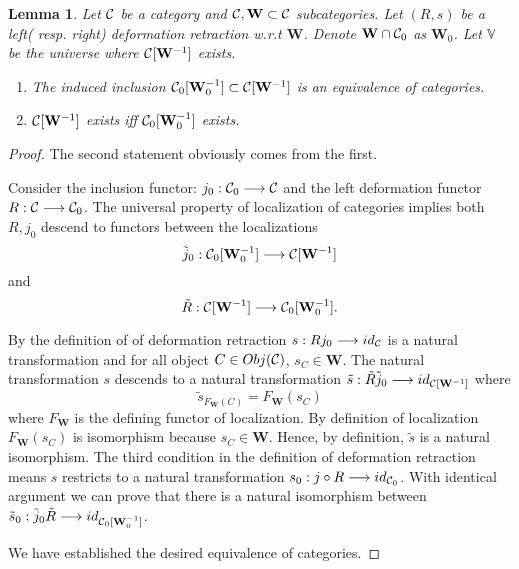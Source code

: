 \documentclass[11pt]{article}
\newtheorem{lemma}[thm]{Lemma}
\newcommand{\calc}{{\cal C}}
\newcommand{\lrta}{\longrightarrow}
\begin{document}
\begin{lemma}\label{lem:equivalence_fo_localization_cat}
Let $\calc$ be a category and $\calc, \mathbf{W}\subset \calc$ subcategories. Let $(R,s)$ be a left( resp. right) deformation retraction w.r.t $\mathbf{W}$. Denote $\mathbf{W}\cap \calc_0$ as $\mathbf{W}_0$. Let $\mathbb{V}$ be the universe where $\calc[\mathbf{W}^{-1}]$ exists.
\begin{enumerate}
\item The induced inclusion $\calc_0[\mathbf{W}_0^{-1}]\subset \calc[\mathbf{W}^{-1}]$ is an equivalence of categories. 
\item $\calc[\mathbf{W}^{-1}]$ exists iff $\calc_0[\mathbf{W}_0^{-1}]$ exists.
\end{enumerate}
\end{lemma}
\begin{proof}
The second statement obviously comes from the first.

Consider the inclusion functor: $j_0:\calc_0\lrta \calc$ and the left deformation functor $R:\calc\lrta \calc_0$. The universal property of localization of categories implies both $R,j_0$ descend to functors between the localizations
$$
\tilde{j}_0:\calc_0[\mathbf{W}_0^{-1}]\lrta \calc[\mathbf{W}^{-1}]
$$
and
$$
\tilde{R}:\calc[\mathbf{W}^{-1}]\lrta \calc_0[\mathbf{W}_0^{-1}].
$$

By the definition of of deformation retraction $s: R j_0\lrta id_\calc$ is a natural transformation and for all object $C\in Obj(\calc)$, $s_C\in \mathbf{W}$.  The natural transformation $s$ descends to a natural transformation
$\tilde{s}:\tilde{R}\tilde{j}_0\lrta id_{\calc[\mathbf{W}^{-1}]}$
where 
$$
\tilde{s}_{F_\mathbf{W}(C)}=F_{\mathbf{W}}(s_C)
$$
where $F_\mathbf{W}$ is the defining functor of localization. By definition of localization $F_\mathbf{W}(s_C)$ is isomorphism because $s_C\in \mathbf{W}$. Hence, by definition, $\tilde{s}$ is a natural isomorphism. The third condition in the definition of deformation retraction means $s$ restricts to a natural transformation $s_0:j\circ R\lrta id_{\calc_0}$. With identical argument we can prove that there is a natural isomorphism between $\tilde{s}_0:\tilde{j}_0\tilde{R}\lrta id_{\calc_0[\mathbf{W}_0^{-1}]}$. 

We have established the desired equivalence of categories.
\end{proof}
\end{document}
